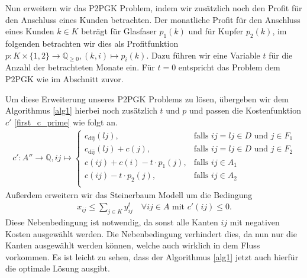 \documentclass[11pt,a4paper]{article}
\newcommand{\Q}{\mathbb{Q}}
\theoremstyle{my_th_style1}
\begin{document}
Nun erweitern wir das P2PGK Problem, indem wir zusätzlich noch den Profit für den Anschluss eines Kunden betrachten.
Der monatliche Profit für den Anschluss eines Kunden $k \in K$ beträgt für Glasfaser $p_1(k)$ und für Kupfer $p_2(k)$, im folgenden betrachten wir dies als Profitfunktion $p:K \times \{1,2\} \rightarrow \Q_{ \geq 0 },(k,i) \mapsto p_i(k)$.
Dazu führen wir eine Variable $t$ für die Anzahl der betrachteten Monate ein.
Für $t=0$ entspricht das Problem dem P2PGK wie im Abschnitt zuvor.

Um diese Erweiterung unseres P2PGK Problems zu lösen, übergeben wir dem Algorithmus \ref{alg1} hierbei noch zusätzlich $t$ und $p$ und passen die Kostenfunktion \(c'\) \eqref{first_c_prime} wie folgt an.
\begin{align*}
c': A'' \rightarrow \Q, ij \mapsto \left\{\begin{array}{cl} 
c_{\text{dij}}(lj), & \text{falls } ij = lj \in D \text{ und } j \in F_1\\ 
c_{\text{dij}}(lj)+c(j), & \text{falls } ij = lj \in D \text{ und } j \in F_2\\ 
c(ij) + c(i) - t \cdot p_1(j), & \text{falls } ij \in A_1\\ 
c(ij) - t \cdot p_2(j), & \text{falls } ij \in A_2\\ 
\end{array}
\right.
\end{align*}
Außerdem erweitern wir das Steinerbaum Modell um die Bedingung 
\begin{align*}
	x_{ij} \leq \displaystyle\sum_{j \in K} y_{ij}^t \quad \forall ij \in A \text{ mit } c'(ij) \leq 0.
\end{align*}
Diese Nebenbedingung ist notwendig, da sonst alle Kanten $ij$ mit negativen Kosten ausgewählt werden.
Die Nebenbedingung verhindert dies, da nun nur die Kanten ausgew\"ahlt werden können, welche auch wirklich in dem Fluss vorkommen.
Es ist leicht zu sehen, dass der Algorithmus \ref{alg1} jetzt auch hierfür die optimale Lösung ausgibt. 
\end{document}
